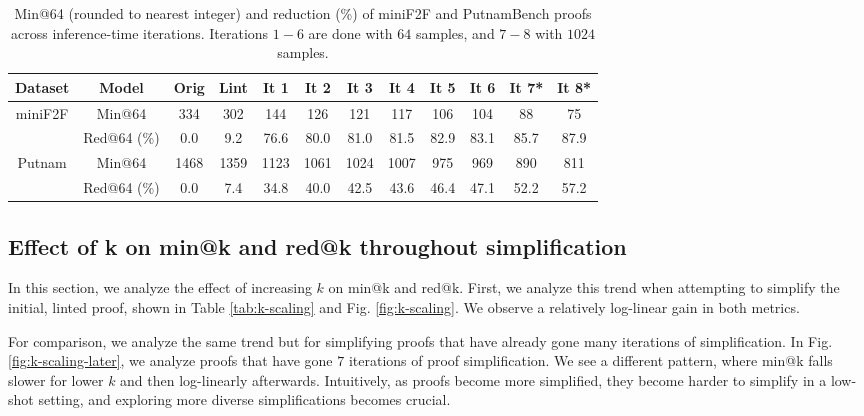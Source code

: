 \begin{table}[H]
\caption{Min@64 (rounded to nearest integer) and reduction (\%) of miniF2F and PutnamBench proofs across inference-time iterations. Iterations $1-6$ are done with $64$ samples, and $7-8$ with $1024$ samples. }
\label{tab:inference-iteration-results-all}
\centering
\begin{tabular}{c | c | c c c c c c c c c c}
\toprule
\textbf{Dataset} & \textbf{Model} & \textbf{Orig} & \textbf{Lint} & \textbf{It 1} & \textbf{It 2} & \textbf{It 3} & \textbf{It 4} & \textbf{It 5} & \textbf{It 6} & \textbf{It 7*} & \textbf{It 8*} \\
\midrule
\multirow{2}{*}{miniF2F} 
& Min@64 & 334 & 302 & 144 & 126 & 121 & 117 & 106 & 104 & 88 & 75 \\
& Red@64 (\%) & 0.0 & 9.2 & 76.6 & 80.0 & 81.0 & 81.5 & 82.9 & 83.1 & 85.7 & 87.9 \\
\midrule
\multirow{2}{*}{Putnam} 
& Min@64 & 1468 & 1359 & 1123 & 1061 & 1024 & 1007 & 975 & 969 & 890 & 811 \\
& Red@64 (\%) & 0.0 & 7.4 & 34.8 & 40.0 & 42.5 & 43.6 & 46.4 & 47.1 & 52.2 & 57.2 \\
\bottomrule
\end{tabular}
\end{table}

\subsection{Effect of k on min@k and red@k throughout simplification} \label{subsec-effect-of-k}
In this section, we analyze the effect of increasing $k$ on min@k and red@k. First, we analyze this trend when attempting to simplify the initial, linted proof, shown in Table \ref{tab:k-scaling} and Fig. \ref{fig:k-scaling}. We observe a relatively log-linear gain in both metrics. 

For comparison, we analyze the same trend but for simplifying proofs that have already gone many iterations of simplification. In Fig. \ref{fig:k-scaling-later}, we analyze proofs that have gone $7$ iterations of proof simplification. We see a different pattern, where min@k falls slower for lower $k$ and then log-linearly afterwards. Intuitively, as proofs become more simplified, they become harder to simplify in a low-shot setting, and exploring more diverse simplifications becomes crucial. 


